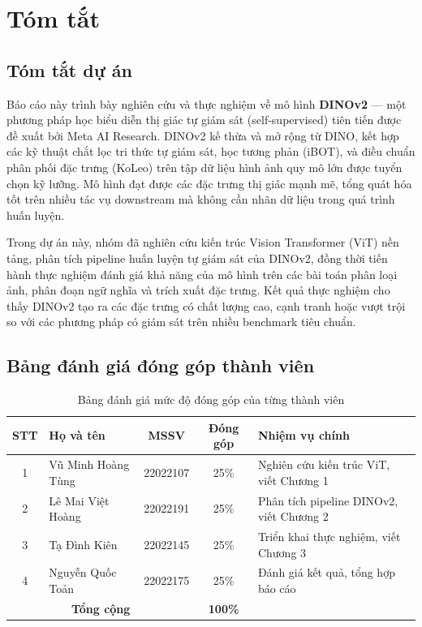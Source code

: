 \documentclass[a4paper,12pt]{report}
\numberwithin{algorithm}{chapter}
\begin{document}
\chapter*{Tóm tắt}

\section*{Tóm tắt dự án}

Báo cáo này trình bày nghiên cứu và thực nghiệm về mô hình \textbf{DINOv2} --- một phương pháp học biểu diễn thị giác tự giám sát (self-supervised) tiên tiến được đề xuất bởi Meta AI Research. DINOv2 kế thừa và mở rộng từ DINO, kết hợp các kỹ thuật chắt lọc tri thức tự giám sát, học tương phản (iBOT), và điều chuẩn phân phối đặc trưng (KoLeo) trên tập dữ liệu hình ảnh quy mô lớn được tuyển chọn kỹ lưỡng. Mô hình đạt được các đặc trưng thị giác mạnh mẽ, tổng quát hóa tốt trên nhiều tác vụ downstream mà không cần nhãn dữ liệu trong quá trình huấn luyện.

Trong dự án này, nhóm đã nghiên cứu kiến trúc Vision Transformer (ViT) nền tảng, phân tích pipeline huấn luyện tự giám sát của DINOv2, đồng thời tiến hành thực nghiệm đánh giá khả năng của mô hình trên các bài toán phân loại ảnh, phân đoạn ngữ nghĩa và trích xuất đặc trưng. Kết quả thực nghiệm cho thấy DINOv2 tạo ra các đặc trưng có chất lượng cao, cạnh tranh hoặc vượt trội so với các phương pháp có giám sát trên nhiều benchmark tiêu chuẩn.

\vspace{1.5cm}

\section*{Bảng đánh giá đóng góp thành viên}

\begin{table}[h]
    \centering
    \renewcommand{\arraystretch}{1.5}
    \begin{tabular}{|c|l|c|c|p{5.5cm}|}
        \hline
        \textbf{STT} & \textbf{Họ và tên} & \textbf{MSSV} & \textbf{Đóng góp} & \textbf{Nhiệm vụ chính} \\
        \hline
        1 & Vũ Minh Hoàng Tùng & 22022107 & 25\% & Nghiên cứu kiến trúc ViT, viết Chương 1 \\
        \hline
        2 & Lê Mai Việt Hoàng  & 22022191 & 25\% & Phân tích pipeline DINOv2, viết Chương 2 \\
        \hline
        3 & Tạ Đình Kiên       & 22022145 & 25\% & Triển khai thực nghiệm, viết Chương 3 \\
        \hline
        4 & Nguyễn Quốc Toản   & 22022175 & 25\% & Đánh giá kết quả, tổng hợp báo cáo \\
        \hline
        \multicolumn{3}{|c|}{\textbf{Tổng cộng}} & \textbf{100\%} & \\
        \hline
    \end{tabular}
    \caption*{Bảng đánh giá mức độ đóng góp của từng thành viên}
\end{table}
\end{document}
